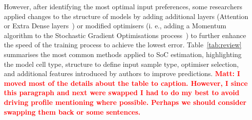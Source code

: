 However, after identifying the most optimal input preferences, some researchers applied changes to the structure of models by adding additional layers (Attention or Extra Dense layers~\cite{mamo_long_2020, jiao_gru-rnn_2020}) or modified optimisers (i. e., adding a Momentum algorithm to the Stochastic Gradient Optimisations process~\cite{xiao_accurate_2019}) to further enhance the speed of the training process to achieve the lowest error.
\mbox{Table~\ref{tab:review}} summarises the most common methods applied to SoC estimation, highlighting the model cell type, structure to define input sample type, optimiser selection, and additional features introduced by authors to improve predictions.
\textcolor{red}{\textbf{Matt: I moved most of the details about the table to caption. However, I since this paragraph and next were swapped I had to do my best to avoid driving profile mentioning where possible. Perhaps we should consider swapping them back or some sentences.}}
